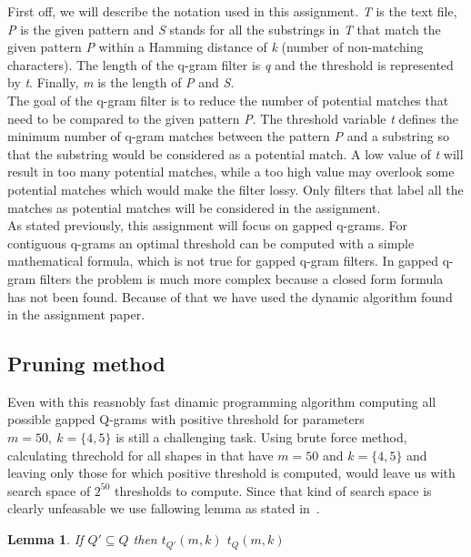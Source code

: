 \documentclass[paper=a4, fontsize=11pt]{scrartcl} %
\newtheorem{lemma}[theorem]{Lemma}
\numberwithin{equation}{section} %
\numberwithin{figure}{section} %
\numberwithin{table}{section} %
\begin{document}
First off, we will describe the notation used in this assignment. \textit{T} is the text file, \textit{P} is the given pattern and \textit{S} stands 
for all the substrings in \textit{T} that match the given pattern \textit{P} within a Hamming distance of \textit{k} (number of non-matching characters). 
The length of the q-gram filter is \textit{q} and the threshold is represented by \textit{t}. Finally, \textit{m} is the length of \textit{P} and \textit{S}. \\
The goal of the q-gram filter is to reduce the number of potential matches that need to be compared to the given pattern \textit{P}. 
The threshold variable \textit{t} defines the minimum number of q-gram matches between the pattern \textit{P} and 
a substring so that the substring would be considered as a potential match. A low value of \textit{t} will result in too many potential matches, 
while a too high value may overlook some potential matches which would make the filter lossy. Only filters that label all the matches as 
potential matches will be considered in the assignment.\\
As stated previously, this assignment will focus on gapped q-grams. For contiguous q-grams an optimal threshold can be computed with a
simple mathematical formula, which is not true for gapped q-gram filters. In gapped q-gram filters the problem is much more complex
because a closed form formula has not been found. Because of that we have used the dynamic algorithm found in the assignment paper.




\subsection{Pruning method}

Even with this reasnobly fast dinamic programming algorithm computing all possible gapped Q-grams with positive threshold for parameters $m=50,\ k=\{4,5\}$ is still a challenging task. Using brute force method, calculating threchold for all shapes in that have $m=50$ and $k=\{4,5\}$ and leaving only those for which positive threshold is computed, would leave us with search space of $2^{50}$ thresholds to compute. Since that kind of search space is clearly unfeasable we use fallowing lemma as
stated in~\cite{njihovPaper}. 

\begin{lemma}
    \label{subSetLemma}
    If $Q' \subseteq Q$ then $t_{Q'}(m,k)$ \geq $t_{Q}(m,k)$
\end{lemma}
\end{document}
